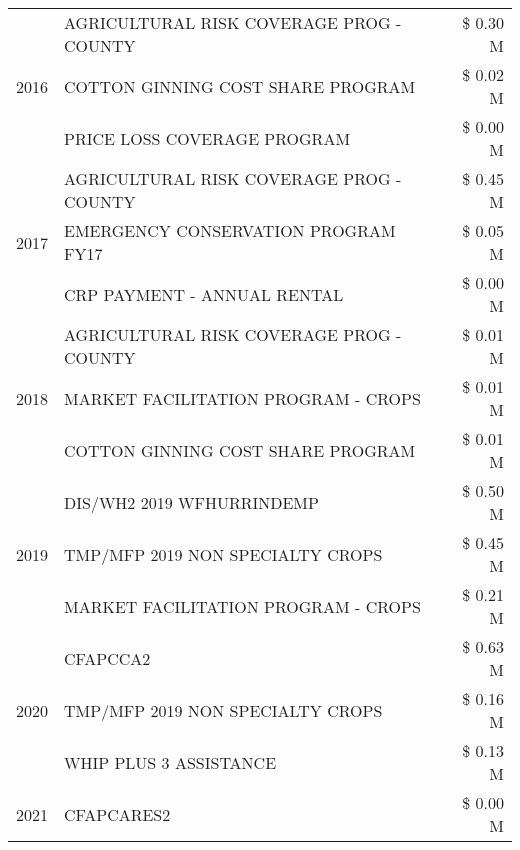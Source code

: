 \begin{tabular}{llr}
\cline{1-3}
\multirow[t]{3}{*}{2016} & AGRICULTURAL RISK COVERAGE PROG - COUNTY & \$ 0.30 M \\
 & COTTON GINNING COST SHARE PROGRAM & \$ 0.02 M \\
 & PRICE LOSS COVERAGE PROGRAM & \$ 0.00 M \\
\cline{1-3}
\multirow[t]{3}{*}{2017} & AGRICULTURAL RISK COVERAGE PROG - COUNTY & \$ 0.45 M \\
 & EMERGENCY CONSERVATION PROGRAM FY17 & \$ 0.05 M \\
 & CRP PAYMENT - ANNUAL RENTAL & \$ 0.00 M \\
\cline{1-3}
\multirow[t]{3}{*}{2018} & AGRICULTURAL RISK COVERAGE PROG - COUNTY & \$ 0.01 M \\
 & MARKET FACILITATION PROGRAM - CROPS & \$ 0.01 M \\
 & COTTON GINNING COST SHARE PROGRAM & \$ 0.01 M \\
\cline{1-3}
\multirow[t]{3}{*}{2019} & DIS/WH2 2019 WFHURRINDEMP & \$ 0.50 M \\
 & TMP/MFP 2019 NON SPECIALTY CROPS & \$ 0.45 M \\
 & MARKET FACILITATION PROGRAM - CROPS & \$ 0.21 M \\
\cline{1-3}
\multirow[t]{3}{*}{2020} & CFAPCCA2 & \$ 0.63 M \\
 & TMP/MFP 2019 NON SPECIALTY CROPS & \$ 0.16 M \\
 & WHIP PLUS 3 ASSISTANCE & \$ 0.13 M \\
\cline{1-3}
2021 & CFAPCARES2 & \$ 0.00 M \\
\cline{1-3}
\bottomrule
\end{tabular}
